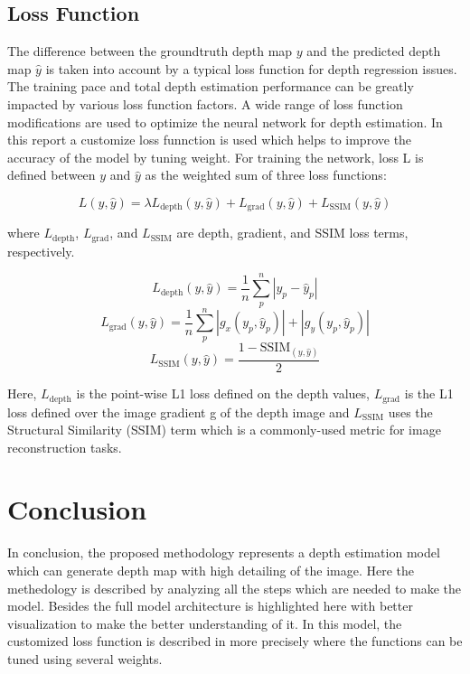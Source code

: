 \documentclass[a4paper,12pt,oneside]{book}
\begin{document}
\subsection{Loss Function}
The difference between the groundtruth depth map $y$ and the predicted depth map $\hat{y}$ is taken into account by a typical loss function for depth regression issues. The training pace and total depth estimation performance can be greatly impacted by various loss function factors. A wide range of loss function modifications are used to optimize the neural network for depth estimation. In this report a customize loss funnction is used which helps to improve the accuracy of the model by tuning weight.
For training the network, loss L is defined between
$y$ and $\hat{y}$ as the weighted sum of three loss functions:

\begin{equation}
    L(y, \hat{y}) = \lambda L_{\text{depth}}(y, \hat{y}) + L_{\text{grad}}(y, \hat{y}) + L_{\text{SSIM}}(y, \hat{y})
\end{equation}

where $L_{\text{depth}}$, $L_{\text{grad}}$, and $L_{\text{SSIM}}$ are depth, gradient, and SSIM loss terms, respectively.


\begin{equation}
        L_{\text{depth}}(y, \hat{y}) = \frac{1}{n} \sum_{p}^{n} \left| y_p - \hat{y}_p \right|
        \label{eqn:eq2}
\end{equation}
\begin{equation}
        L_{\text{grad}}(y, \hat{y}) = \frac{1}{n} \sum_{p}^{n} \left| g_x(y_p , \hat{y}_p) \right| + \left| g_y(y_p , \hat{y}_p) \right|
        \label{eqn:eq2}
\end{equation}
\begin{equation}
        L_{\text{SSIM}}(y, \hat{y}) = \frac{1 - \text{SSIM}_(y, \hat{y})}{2}
        \label{eqn:eq2}
\end{equation}

Here, $L_{\text{depth}}$ is the point-wise L1 loss defined
on the depth values, $L_{\text{grad}}$ is the L1 loss defined over
the image gradient g of the depth image and $L_{\text{SSIM}}$ uses the Structural Similarity (SSIM) term which is a commonly-used metric for image reconstruction
tasks.

\section{Conclusion}
In conclusion, the proposed methodology represents a depth estimation model which can generate depth map with high detailing of the image. Here the methedology is described by analyzing all the steps which are needed to make the model. Besides the full model architecture is highlighted here with better visualization to make the better understanding of it. In this model, the customized loss function is described in more precisely where the functions can be tuned using several weights.
\end{document}
